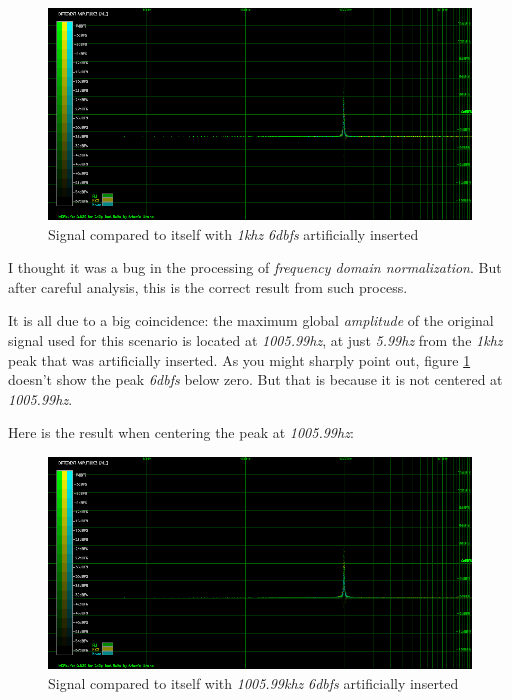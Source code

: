 \documentclass[10pt,a4paper]{report}
\newcommand{\fhz}[1]{\textit{#1\acrshort{hz}}}
\newcommand{\fkhz}[1]{\textit{#1\acrshort{khz}}}
\newcommand{\db}[1]{\textit{#1\acrshort{dbfs}}}
\begin{document}
\begin{appendices}
\begin{figure}[H]
	\centering
	\includegraphics[width=1.0\linewidth]{images/corner/plot1.png}
	\caption[Corner Case 1]{Signal compared to itself with \fkhz{1} \db{6} artificially inserted}
	\label{fig:corner1}
\end{figure}

I thought it was a bug in the processing of \textit{frequency domain normalization}. But after careful analysis, this is the correct result from such process.

It is all due to a big coincidence: the maximum global \textit{amplitude} of the original signal used for this scenario is located at \fhz{1005.99}, at just \fhz{5.99} from the \fkhz{1} peak that was artificially inserted. As you might sharply point out, figure \ref{fig:corner1} doesn't show the peak \db{6} below zero. But that is because it is not centered at \fhz{1005.99}. 

Here is the result when centering the peak at \fhz{1005.99}:

\begin{figure}[H]
\centering
\includegraphics[width=1.0\linewidth]{images/corner/plot2.png}
\caption[Corner Case 2]{Signal compared to itself with \fkhz{1005.99} \db{6} artificially inserted}
\label{fig:corner2}
\end{figure}


\end{appendices}
\end{document}
